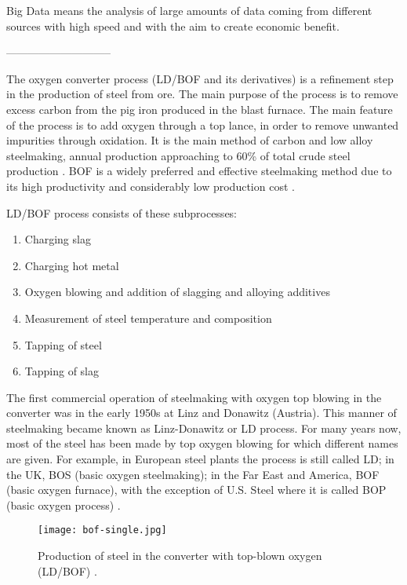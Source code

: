 Big Data means the analysis of large amounts of data coming from different sources with high speed and with the aim to create economic benefit.

-----------------------------


The oxygen converter process (LD/BOF and its derivatives) is a refinement step in the production of steel from ore. The main purpose of the process is to remove excess carbon from the pig iron produced in the blast furnace. The main feature of the process is to add oxygen through a top lance, in order to remove unwanted impurities through oxidation. It is the main method of carbon and low alloy steelmaking, annual production approaching to 60\% of total crude steel production \citep{Jalkanen2006}. BOF is a widely preferred and effective steelmaking method due to its high productivity and considerably low production cost \citep{Wang2010}.

 LD/BOF process consists of these subprocesses:

\begin{enumerate}
	\item Charging slag
	\item Charging hot metal 
	\item Oxygen blowing and addition of slagging and alloying additives
	\item Measurement of steel temperature and composition
	\item Tapping of steel
	\item Tapping of slag
\end{enumerate}

The first commercial operation of steelmaking with oxygen top blowing in the converter was in the early 1950s at Linz and Donawitz (Austria). This manner of steelmaking became known as Linz-Donawitz or LD process. For many years now, most of the steel has been made by top oxygen blowing for which different names are given. For example, in European steel plants the process is still called LD; in the UK, BOS (basic oxygen steelmaking); in the Far East and America, BOF (basic oxygen furnace), with the exception of U.S. Steel where it is called BOP (basic oxygen process) \citep{Turkdogan1996}.

\begin{figure}[h!]
	\centering
	\texttt{[image: bof-single.jpg]}
	\caption{Production of steel in the converter with top-blown oxygen (LD/BOF) \citep{Turkdogan1996}.}
	\label{o:1}
\end{figure}

